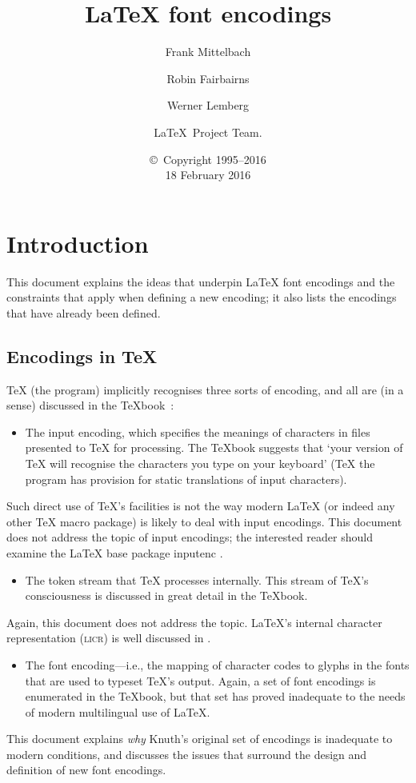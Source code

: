 \documentclass{ltxguide}[1994/11/20]
\title{\LaTeX{} font encodings}
\author{Frank Mittelbach \and Robin
   Fairbairns \and Werner Lemberg \and \LaTeX\ Project Team.}
\date{\copyright~Copyright 1995--2016 \\[5pt] 18 February 2016}
\providecommand{\Pkg}[1]{%
  \textsf{#1}}
\begin{document}
\maketitle

\tableofcontents

\section{Introduction}

This  document explains the ideas that underpin \LaTeX{} font
encodings and the constraints that apply when defining a new encoding; it
also lists the encodings that have already been defined.

\subsection{Encodings in \TeX{}}

\TeX{} (the program) implicitly recognises three sorts of encoding,
and all are (in a sense) discussed in the \TeX{}book~\cite{A-W:DKn86}:
\begin{itemize}
\item[1.] The input encoding, which specifies the meanings of characters
  in files presented to \TeX{} for processing.  The \TeX{}book
  suggests that `your version of \TeX{} will recognise the characters
  you type on your keyboard' (\TeX{} the program has provision for
  static translations of input characters).
\end{itemize}
Such direct use of \TeX{}'s facilities is not the way modern
\LaTeX{} (or indeed any other \TeX{} macro package) is likely to deal
with input encodings.   This document does not address the topic of
input encodings; the interested reader should examine the \LaTeX{}
base package \Pkg{inputenc} \cite[sec.~7.5.2, p.~357]{A-W:MG2004}.
\begin{itemize}
\item[2.] The token stream that \TeX{} processes internally.  This stream
  of \TeX{}'s consciousness is discussed in great detail in the
  \TeX{}book.
\end{itemize}
Again, this document does not address the topic.  \LaTeX's internal
character representation (\textsc{licr}) is well discussed in
\cite[sec.~7.11.2, p.~442]{A-W:MG2004}.
\begin{itemize}
\item[3.] The font encoding---i.e., the mapping of character codes to
  glyphs in the fonts that are used to typeset \TeX{}'s output.
  Again, a set of font encodings is enumerated in the \TeX{}book, but
  that set has proved inadequate to the needs of modern multilingual
  use of \LaTeX.
\end{itemize}
This document explains \emph{why} Knuth's original set of encodings is
inadequate to modern conditions, and discusses the issues that
surround the design and definition of new font encodings.
\end{document}
